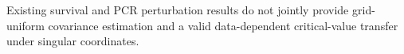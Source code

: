 Existing survival and PCR perturbation results do not jointly provide grid-uniform covariance estimation and a valid data-dependent critical-value transfer under singular coordinates.